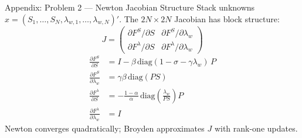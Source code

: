 \documentclass[aspectratio=169,11pt]{beamer}
\begin{document}
\begin{frame}{Appendix: Problem 2 --- Newton Jacobian Structure}
    Stack unknowns $x = (S_1,\ldots,S_N,\lambda_{w,1},\ldots,\lambda_{w,N})'$. The $2N\times 2N$ Jacobian has block structure:
    \[
    J = \begin{pmatrix}
    \partial F^S/\partial S & \partial F^S/\partial\lambda_w \\
    \partial F^\lambda/\partial S & \partial F^\lambda/\partial\lambda_w
    \end{pmatrix}
    \]
    \vspace{0.2em}
    \small
    \begin{align*}
    \frac{\partial F^S}{\partial S} &= I - \beta\,\mathrm{diag}(1-\sigma-\gamma\lambda_w)\,P \\[4pt]
    \frac{\partial F^S}{\partial\lambda_w} &= \gamma\beta\,\mathrm{diag}(PS) \\[4pt]
    \frac{\partial F^\lambda}{\partial S} &= -\frac{1-\alpha}{\alpha}\,\mathrm{diag}\!\left(\frac{\lambda_w}{PS}\right)P \\[4pt]
    \frac{\partial F^\lambda}{\partial\lambda_w} &= I
    \end{align*}
    \normalsize
    Newton converges quadratically; Broyden approximates $J$ with rank-one updates.
\end{frame}
\end{document}
